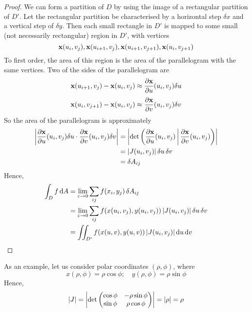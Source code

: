\begin{proof}
	We can form a partition of \(D\) by using the image of a rectangular partition of \(D'\).
	Let the rectangular partition be characterised by a horizontal step \(\delta x\) and a vertical step of \(\delta y\).
	Then each small rectangle in \(D'\) is mapped to some small (not necessarily rectangular) region in \(D'\), with vertices
	\[
		\vb x(u_i, v_j), \vb x(u_{i+1}, v_j), \vb x(u_{i+1}, v_{j+1}), \vb x(u_i, v_{j+1})
	\]
	To first order, the area of this region is the area of the parallelogram with the same vertices.
	Two of the sides of the parallelogram are
	\[
		\vb x(u_{i+1}, v_j) - \vb x(u_i, v_j) \approx \frac{\partial \vb x}{\partial u}(u_i, v_j) \delta u
	\]
	\[
		\vb x(u_i, v_{j+1}) - \vb x(u_i, v_j) \approx \frac{\partial \vb x}{\partial v}(u_i, v_j) \delta v
	\]
	So the area of the parallelogram is approximately
	\begin{align*}
		\abs{\frac{\partial \vb x}{\partial u}(u_i, v_j) \delta u \cdot \frac{\partial \vb x}{\partial v}(u_i, v_j) \delta v} & = \abs{\det \left( \frac{\partial \vb x}{\partial u}(u_i, v_j) \,\middle|\, \frac{\partial \vb x}{\partial v}(u_i, v_j) \right)} \\
		                                                                                                                      & = \abs{J(u_i, v_j)} \,\delta u \,\delta v                                                                                        \\
		                                                                                                                      & = \delta A_{ij}
	\end{align*}
	Hence,
	\begin{align*}
		\int_D f \dd{A} & = \lim_{\varepsilon \to 0} \sum_{ij} f(x_i, y_j)\,\delta A_{ij}                                           \\
		                & = \lim_{\varepsilon \to 0} \sum_{ij} f(x(u_i, v_j), y(u_i, v_j)) \,\abs{J(u_i, v_j)} \,\delta u\,\delta v \\
		                & = \iint_{D'} f(x(u, v), y(u, v)) \,\abs{J(u_i, v_j)} \dd{u} \dd{v}
	\end{align*}
\end{proof}
As an example, let us consider polar coordinates \((\rho, \phi)\), where
\[
	x(\rho, \phi) = \rho \cos \phi;\quad y(\rho, \phi) = \rho \sin \phi
\]
Hence,
\[
	\abs{J} = \abs{\det \begin{pmatrix}
			\cos \phi & -\rho \sin \phi \\
			\sin \phi & \rho \cos \phi
		\end{pmatrix}} = \abs{\rho} = \rho
\]
